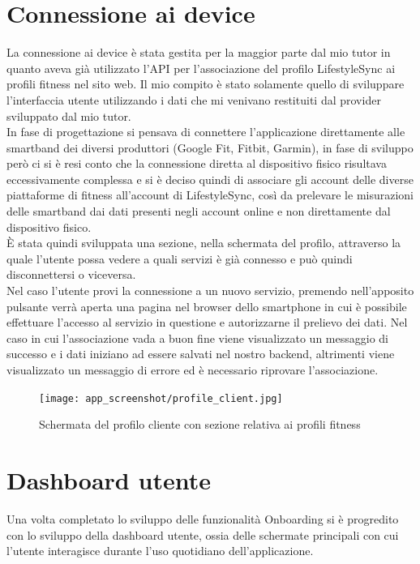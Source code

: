\section{Connessione ai device}
La connessione ai device è stata gestita per la maggior parte dal mio tutor in quanto aveva già utilizzato l'API per l'associazione del profilo LifestyleSync ai profili fitness nel sito web. Il mio compito è stato solamente quello di sviluppare l'interfaccia utente utilizzando i dati che mi venivano restituiti dal provider sviluppato dal mio tutor.\\
In fase di progettazione si pensava di connettere l'applicazione direttamente alle smartband dei diversi produttori (Google Fit, Fitbit, Garmin), in fase di sviluppo però ci si è resi conto che la connessione diretta al dispositivo fisico risultava eccessivamente complessa e si è deciso quindi di associare gli account delle diverse piattaforme di fitness all'account di LifestyleSync, così da prelevare le misurazioni delle smartband dai dati presenti negli account online e non direttamente dal dispositivo fisico.\\
È stata quindi sviluppata una sezione, nella schermata del profilo, attraverso la quale l'utente possa vedere a quali servizi è già connesso e può quindi disconnettersi o viceversa.\\
Nel caso l'utente provi la connessione a un nuovo servizio, premendo nell'apposito pulsante verrà aperta una pagina nel browser dello smartphone in cui è possibile effettuare l'accesso al servizio in questione e autorizzarne il prelievo dei dati. Nel caso in cui l'associazione vada a buon fine viene visualizzato un messaggio di successo e i dati iniziano ad essere salvati nel nostro backend, altrimenti viene visualizzato un messaggio di errore ed è necessario riprovare l'associazione.
\begin{figure}[H]
    \centering
    \texttt{[image: app\_screenshot/profile\_client.jpg]}
    \caption{Schermata del profilo cliente con sezione relativa ai profili fitness}
\end{figure}
\section{Dashboard utente}
Una volta completato lo sviluppo delle funzionalità Onboarding si è progredito con lo sviluppo della dashboard utente, ossia delle schermate principali con cui l'utente interagisce durante l'uso quotidiano dell'applicazione.
